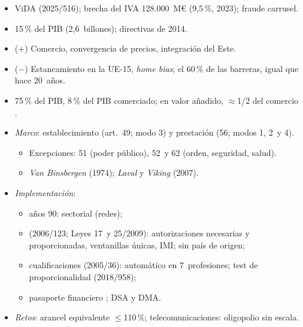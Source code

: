 \documentclass{article}
\begin{document}
\begin{columnas}
\begin{itemize}
\begin{itemize}
  \item ViDA (2025/516); brecha del IVA 128.000~M€ (9,5\,\%, 2023); fraude carrusel.
  \end{itemize}
\end{itemize}
\begin{itemize}
\item 15\,\% del PIB (2,6~billones); directivas de 2014.
\end{itemize}
\begin{itemize}
\item (+) Comercio, convergencia de precios, integración del Este.
\item ($-$) Estancamiento en la UE-15, \emph{home bias}; el 60\,\% de las barreras, igual que hace 20~años.
\end{itemize}

\begin{itemize}
\item 75\,\% del PIB, 8\,\% del PIB comerciado; en valor añadido, $\approx$1/2 del comercio .
\item \emph{Marco}: establecimiento (art.~49; modo 3) y prestación (56; modos 1, 2~y 4).
  \begin{itemize}
  \item Excepciones: 51 (poder público), 52~y 62 (orden, seguridad, salud).
  \item \emph{Van Binsbergen} (1974); \emph{Laval} y \emph{Viking} (2007).
  \end{itemize}
\item \emph{Implementación}:
  \begin{itemize}
  \item años 90: sectorial (redes);
  \item {} (2006/123; Leyes 17~y 25/2009): autorizaciones necesarias y proporcionadas, ventanillas únicas, IMI; sin país de origen;
  \item cualificaciones (2005/36): automático en 7~profesiones; test de proporcionalidad (2018/958);
  \item pasaporte financiero ; DSA y DMA.
  \end{itemize}
\item \emph{Retos}: arancel equivalente $\leq$110\,\%; telecomunicaciones: oligopolio sin escala.
\end{itemize}


\end{columnas}
\end{document}
